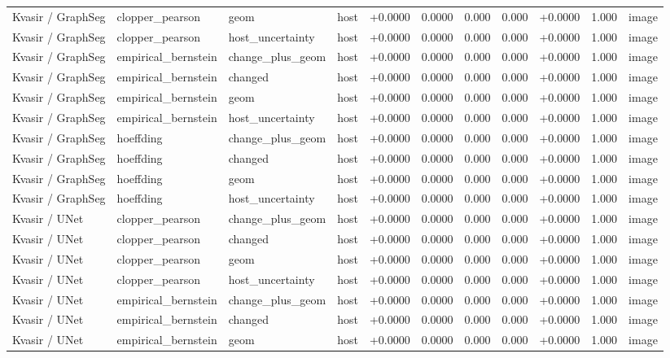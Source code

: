 \begin{table}[t]
\begin{tabular}{lllllllllll}
Kvasir / GraphSeg & clopper\_pearson & geom & host & +0.0000 & 0.0000 & 0.000 & 0.000 & +0.0000 & 1.000 & image \\
Kvasir / GraphSeg & clopper\_pearson & host\_uncertainty & host & +0.0000 & 0.0000 & 0.000 & 0.000 & +0.0000 & 1.000 & image \\
Kvasir / GraphSeg & empirical\_bernstein & change\_plus\_geom & host & +0.0000 & 0.0000 & 0.000 & 0.000 & +0.0000 & 1.000 & image \\
Kvasir / GraphSeg & empirical\_bernstein & changed & host & +0.0000 & 0.0000 & 0.000 & 0.000 & +0.0000 & 1.000 & image \\
Kvasir / GraphSeg & empirical\_bernstein & geom & host & +0.0000 & 0.0000 & 0.000 & 0.000 & +0.0000 & 1.000 & image \\
Kvasir / GraphSeg & empirical\_bernstein & host\_uncertainty & host & +0.0000 & 0.0000 & 0.000 & 0.000 & +0.0000 & 1.000 & image \\
Kvasir / GraphSeg & hoeffding & change\_plus\_geom & host & +0.0000 & 0.0000 & 0.000 & 0.000 & +0.0000 & 1.000 & image \\
Kvasir / GraphSeg & hoeffding & changed & host & +0.0000 & 0.0000 & 0.000 & 0.000 & +0.0000 & 1.000 & image \\
Kvasir / GraphSeg & hoeffding & geom & host & +0.0000 & 0.0000 & 0.000 & 0.000 & +0.0000 & 1.000 & image \\
Kvasir / GraphSeg & hoeffding & host\_uncertainty & host & +0.0000 & 0.0000 & 0.000 & 0.000 & +0.0000 & 1.000 & image \\
Kvasir / UNet & clopper\_pearson & change\_plus\_geom & host & +0.0000 & 0.0000 & 0.000 & 0.000 & +0.0000 & 1.000 & image \\
Kvasir / UNet & clopper\_pearson & changed & host & +0.0000 & 0.0000 & 0.000 & 0.000 & +0.0000 & 1.000 & image \\
Kvasir / UNet & clopper\_pearson & geom & host & +0.0000 & 0.0000 & 0.000 & 0.000 & +0.0000 & 1.000 & image \\
Kvasir / UNet & clopper\_pearson & host\_uncertainty & host & +0.0000 & 0.0000 & 0.000 & 0.000 & +0.0000 & 1.000 & image \\
Kvasir / UNet & empirical\_bernstein & change\_plus\_geom & host & +0.0000 & 0.0000 & 0.000 & 0.000 & +0.0000 & 1.000 & image \\
Kvasir / UNet & empirical\_bernstein & changed & host & +0.0000 & 0.0000 & 0.000 & 0.000 & +0.0000 & 1.000 & image \\
Kvasir / UNet & empirical\_bernstein & geom & host & +0.0000 & 0.0000 & 0.000 & 0.000 & +0.0000 & 1.000 & image \\

\end{tabular}
\end{table}
